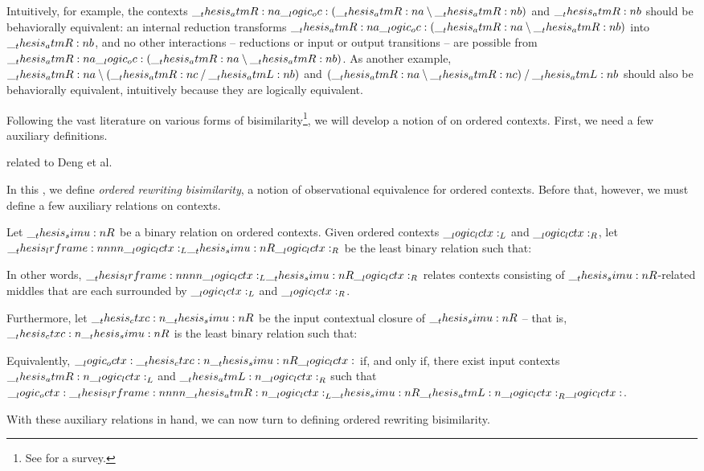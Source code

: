 Intuitively, for example, the contexts $\__thesis_atmR:n {a} \__logic_oc: (\__thesis_atmR:n {a} \mathbin { \setminus } \__thesis_atmR:n {b})$ and $\__thesis_atmR:n {b}$ should be behaviorally equivalent: an internal reduction transforms $\__thesis_atmR:n {a} \__logic_oc: (\__thesis_atmR:n {a} \mathbin { \setminus } \__thesis_atmR:n {b})$ into $\__thesis_atmR:n {b}$, and no other interactions -- reductions or input or output transitions -- are possible from $\__thesis_atmR:n {a} \__logic_oc: (\__thesis_atmR:n {a} \mathbin { \setminus } \__thesis_atmR:n {b})$.
As another example, $\__thesis_atmR:n {a} \mathbin { \setminus } (\__thesis_atmR:n {c} \mathbin { / } \__thesis_atmL:n {b})$ and $(\__thesis_atmR:n {a} \mathbin { \setminus } \__thesis_atmR:n {c}) \mathbin { / } \__thesis_atmL:n {b}$ should also be behaviorally equivalent, intuitively because they are logically equivalent.

Following the vast literature on various forms of bisimilarity\footnote{See \textcite{??} for a survey.}, we will develop a notion of  on ordered contexts.
First, we need a few auxiliary definitions.

related to Deng et al.



In this , we define \emph{ordered rewriting bisimilarity}, a notion of observational equivalence for ordered contexts.
Before that, however, we must define a few auxiliary relations on contexts.
%
\begin{definition}\label{def:ordered-bisimilarity:framed-relation}
  Let $\__thesis_simu:n {R}$ be a binary relation on ordered contexts.
  Given ordered contexts $\__logic_lctx:_L$ and $\__logic_lctx:_R$, let $\lrframe{\lctx_L}{\simu{R}}{\lctx_R}$ be the least binary relation such that:
  \begin{inferences}
  \end{inferences}
  In other words, $\lrframe{\lctx_L}{\simu{R}}{\lctx_R}$ relates contexts consisting of $\__thesis_simu:n {R}$-related middles that are each surrounded by $\__logic_lctx:_L$ and $\__logic_lctx:_R$.

  Furthermore, let $\ctxc{\simu{R}}$ be the input contextual closure of $\__thesis_simu:n {R}$ -- that is, $\ctxc{\simu{R}}$ is the least binary relation such that:
  Equivalently, $\octx \ctxc{\simu{R}} \lctx$ if, and only if, there exist input contexts $\__thesis_atmR:n {\__logic_lctx:}_L$ and $\__thesis_atmL:n {\__logic_lctx:}_R$ such that $\octx \lrframe{\atmR{\lctx}_L}{\simu{R}}{\atmL{\lctx}_R} \lctx$.
\end{definition}
\noindent
With these auxiliary relations in hand, we can now turn to defining ordered rewriting bisimilarity.

